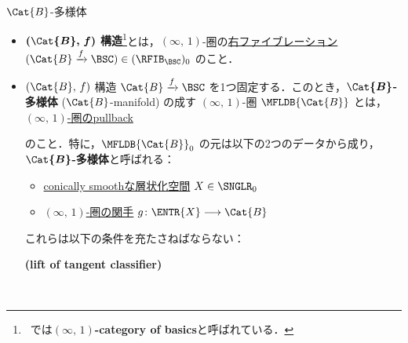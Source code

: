 \documentclass[TQFT_main]{subfiles}
\begin{document}
\begin{mydef}[label=def:B-mfld,breakable]{{$\Cat{B}$}-多様体}
    \begin{itemize}
        \item \textbf{$\bm{(\Cat{B},\, f)}$ 構造}\footnote{~\cite[Definition 1.1.6]{AFT2014stratified}では\textbf{$(\infty,\, 1)$-category of basics}と呼ばれている．}とは，$(\infty,\, 1)$-圏の\hyperref[def:infty-fib]{右ファイブレーション} $(\Cat{B} \xrightarrow{f} \BSC) \in (\RFIB_{\BSC})_0$ のこと．
        \item $(\Cat{B},\, f)$ 構造 $\Cat{B} \xrightarrow{f} \BSC$ を1つ固定する．このとき，\textbf{$\bm{\Cat{B}}$-多様体} ($\Cat{B}$-manifold) の成す $(\infty,\, 1)$-圏 $\MFLDB{\Cat{B}}$ とは，\hyperref[def:pullback-infty]{$(\infty,\, 1)$-圏のpullback}
        \begin{center}
        \end{center}
        のこと．特に，$\MFLDB{\Cat{B}}_0$ の元は以下の2つのデータから成り，\textbf{$\bm{\Cat{B}}$-多様体}と呼ばれる：
        \begin{itemize}
            \item \hyperref[def:c-smooth]{conically smoothな層状化空間} $X \in \SNGLR_0$
            \item \hyperref[def:infinity-1]{$(\infty,\, 1)$-圏の関手} $g \colon \ENTR{X} \lto \Cat{B}$
        \end{itemize}
        これらは以下の条件を充たさねばならない：
        \begin{description}
            \item[\textbf{(lift of tangent classifier)}]　
            

\end{description}
\end{itemize}
\end{mydef}
\end{document}
